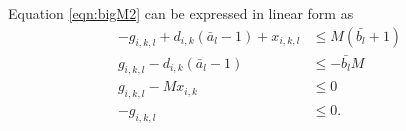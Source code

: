 \par Equation \ref{eqn:bigM2} can be expressed in linear form as 
\begin{equation}\label{eqn:chargeConstraints}
	\begin{aligned} 
		-g_{i,k,l} + d_{i,k}(\bar{a}_l - 1) + x_{i,k,l} &\le M(\bar{b_l} + 1) \\
		 g_{i,k,l} - d_{i,k}(\bar{a}_l - 1)  &\le  - \bar{b_l}M \\
		 g_{i,k,l} - Mx_{i,k} &\le 0 \\
		-g_{i,k,l} &\le 0.  
	\end{aligned}
\end{equation} 
